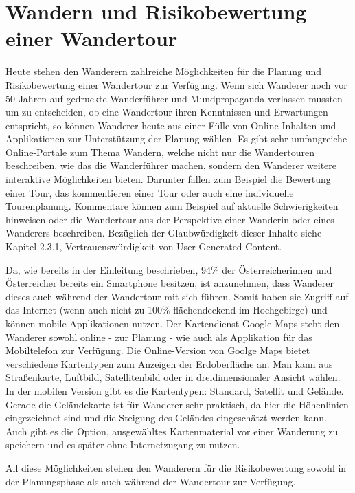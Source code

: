 \section{Wandern und Risikobewertung einer Wandertour}

Heute stehen den Wanderern zahlreiche Möglichkeiten für die Planung und Risikobewertung einer Wandertour zur Verfügung. Wenn sich Wanderer noch vor 50 Jahren auf gedruckte Wanderführer und Mundpropaganda verlassen mussten um zu entscheiden, ob eine Wandertour ihren Kenntnissen und Erwartungen entspricht, so können Wanderer heute aus einer Fülle von Online-Inhalten und Applikationen zur Unterstützung der Planung wählen. Es gibt sehr umfangreiche Online-Portale zum Thema Wandern, welche nicht nur die Wandertouren beschreiben, wie das die Wanderführer machen, sondern den Wanderer  weitere interaktive Möglichkeiten bieten. Darunter fallen zum Beispiel die Bewertung einer Tour, das kommentieren einer Tour oder auch eine individuelle Tourenplanung. Kommentare können zum Beispiel auf aktuelle Schwierigkeiten hinweisen oder die Wandertour aus der Perspektive einer Wanderin oder eines Wanderers beschreiben. Bezüglich der Glaubwürdigkeit dieser Inhalte siehe Kapitel 2.3.1, Vertrauenswürdigkeit von User-Generated Content.

Da, wie bereits in der Einleitung beschrieben, 94\% der Österreicherinnen und Österreicher bereits ein Smartphone besitzen, ist anzunehmen, dass Wanderer dieses auch während der Wandertour mit sich führen. Somit haben sie Zugriff auf das Internet (wenn auch nicht zu 100\% flächendeckend im Hochgebirge) und können mobile Applikationen nutzen. Der Kartendienst Google Maps steht den Wanderer sowohl online - zur Planung -  wie auch als Applikation für das Mobiltelefon zur Verfügung. Die Online-Version von Goolge Maps bietet verschiedene Kartentypen zum Anzeigen der Erdoberfläche an. Man kann aus Straßenkarte, Luftbild, Satellitenbild oder in dreidimensionaler Ansicht wählen. In der mobilen Version gibt es die Kartentypen: Standard, Satellit und Gelände. Gerade die Geländekarte ist für Wanderer sehr praktisch, da hier die Höhenlinien eingezeichnet sind und die Steigung des Geländes eingeschätzt werden  kann. Auch gibt es die Option, ausgewähltes Kartenmaterial vor einer Wanderung zu speichern und es später ohne Internetzugang zu nutzen.

All diese Möglichkeiten stehen den Wanderern für die Risikobewertung sowohl in der Planungsphase als auch während der Wandertour zur Verfügung.




